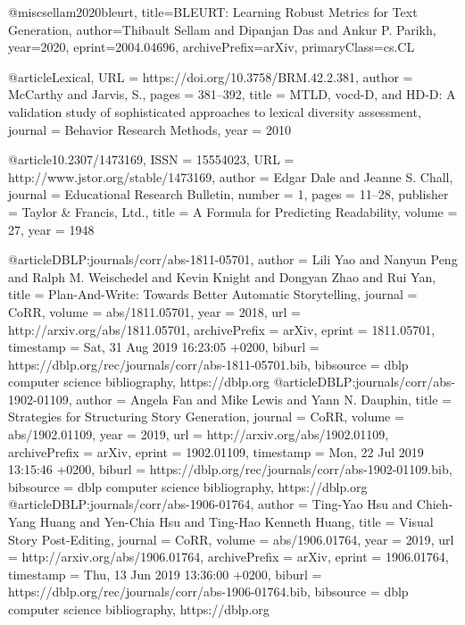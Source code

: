 @misc{sellam2020bleurt,
    title={{BLEURT}: Learning Robust Metrics for Text Generation},
    author={Thibault Sellam and Dipanjan Das and Ankur P. Parikh},
    year={2020},
    eprint={2004.04696},
    archivePrefix={arXiv},
    primaryClass={cs.CL}
}

@article{Lexical,
 URL = {https://doi.org/10.3758/BRM.42.2.381},
 author = {McCarthy and Jarvis, S.},
 pages = {381–392},
 title = {{MTLD, vocd-D, and HD-D}: A validation study of sophisticated approaches to lexical diversity assessment},
 journal = {Behavior Research Methods},
 year = {2010}
}



@article{10.2307/1473169,
 ISSN = {15554023},
 URL = {http://www.jstor.org/stable/1473169},
 author = {Edgar Dale and Jeanne S. Chall},
 journal = {Educational Research Bulletin},
 number = {1},
 pages = {11--28},
 publisher = {Taylor & Francis, Ltd.},
 title = {A Formula for Predicting Readability},
 volume = {27},
 year = {1948}
}


@article{DBLP:journals/corr/abs-1811-05701,
  author    = {Lili Yao and
               Nanyun Peng and
               Ralph M. Weischedel and
               Kevin Knight and
               Dongyan Zhao and
               Rui Yan},
  title     = {Plan-And-Write: Towards Better Automatic Storytelling},
  journal   = {CoRR},
  volume    = {abs/1811.05701},
  year      = {2018},
  url       = {http://arxiv.org/abs/1811.05701},
  archivePrefix = {arXiv},
  eprint    = {1811.05701},
  timestamp = {Sat, 31 Aug 2019 16:23:05 +0200},
  biburl    = {https://dblp.org/rec/journals/corr/abs-1811-05701.bib},
  bibsource = {dblp computer science bibliography, https://dblp.org}
}
@article{DBLP:journals/corr/abs-1902-01109,
  author    = {Angela Fan and
               Mike Lewis and
               Yann N. Dauphin},
  title     = {Strategies for Structuring Story Generation},
  journal   = {CoRR},
  volume    = {abs/1902.01109},
  year      = {2019},
  url       = {http://arxiv.org/abs/1902.01109},
  archivePrefix = {arXiv},
  eprint    = {1902.01109},
  timestamp = {Mon, 22 Jul 2019 13:15:46 +0200},
  biburl    = {https://dblp.org/rec/journals/corr/abs-1902-01109.bib},
  bibsource = {dblp computer science bibliography, https://dblp.org}
}
@article{DBLP:journals/corr/abs-1906-01764,
  author    = {Ting{-}Yao Hsu and
               Chieh{-}Yang Huang and
               Yen{-}Chia Hsu and
               Ting{-}Hao Kenneth Huang},
  title     = {Visual Story Post-Editing},
  journal   = {CoRR},
  volume    = {abs/1906.01764},
  year      = {2019},
  url       = {http://arxiv.org/abs/1906.01764},
  archivePrefix = {arXiv},
  eprint    = {1906.01764},
  timestamp = {Thu, 13 Jun 2019 13:36:00 +0200},
  biburl    = {https://dblp.org/rec/journals/corr/abs-1906-01764.bib},
  bibsource = {dblp computer science bibliography, https://dblp.org}
}

